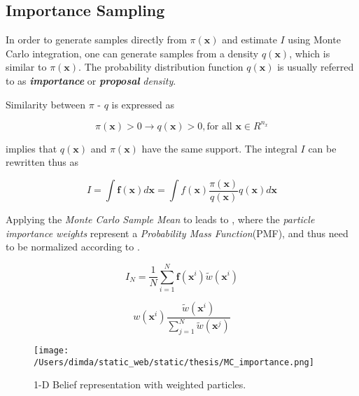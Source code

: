 \subsection{Importance Sampling}

In order to generate samples directly from $\pi (\mathbf{x})$ and estimate $I$ using Monte Carlo integration, one can generate samples from a density $q(\mathbf{x})$, which is similar to $\pi(\mathbf{x})$. The probability distribution function $q(\mathbf{x})$ is usually referred to as \emph{\textbf{importance }}or \emph{\textbf{proposal}} \emph{density}.


Similarity between $\pi \text{ - } q $ is expressed as

\begin{equation}\label{eq:proposal1}
\pi(\mathbf{x}) > 0 \rightarrow q(\mathbf{x})>0 , \text{for all } \mathbf{x} \in R^{n_x}
\end{equation}

  implies that $q(\mathbf{x})$ and $\pi(\mathbf{x})$ have the same support. The integral $I$ can be rewritten thus as

\begin{equation}\label{eq:MCIntegral}
I = \int \mathbf{f}(\mathbf{x}) d\mathbf{x} = \int f(\mathbf{x}) \frac{\pi(\mathbf{x})}{q(\mathbf{x})}q(\mathbf{x}) d\mathbf{x}
\end{equation}


Applying the \emph{Monte Carlo Sample Mean} to  leads to  , where the \emph{particle importance weights} represent a \emph{Probability Mass Function}(PMF), and thus need to be normalized according to .




\begin{equation}\label{eq:MCSM}
	I_N = \frac{1}{N} \sum_{i=1}^{N} \mathbf{f}(\mathbf{x}^i) \tilde{w}(\mathbf{x}^i)
\end{equation}



\begin{equation}\label{eq:weight_normalize}
w(\mathbf{x}^i)  \frac{\tilde{w}(\mathbf{x}^i)}{\sum_{j=1}^N \tilde{w}(\mathbf{x}^j)}
\end{equation}

\begin{figure}[H]
	\centering
	\texttt{[image: /Users/dimda/static\_web/static/thesis/MC\_importance.png]}
	\caption{1-D Belief representation with weighted particles\cite{Rao2013}.}
	\label{fig:1d_belief}
\end{figure}

